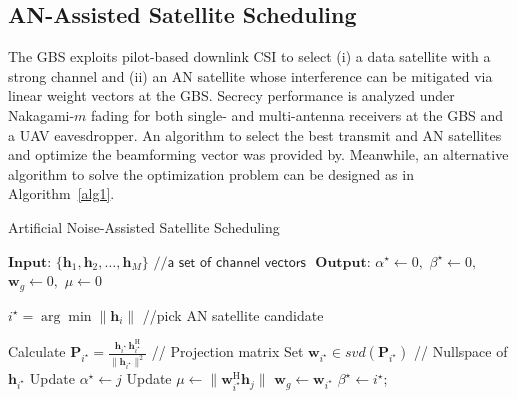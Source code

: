 \documentclass[conference]{IEEEtran}
\begin{document}
\subsection{AN-Assisted Satellite Scheduling} \label{sec3.2}
The GBS exploits pilot-based downlink CSI to select (i) a data satellite with a strong channel and (ii) an AN satellite whose interference can be mitigated via linear weight vectors at the GBS. Secrecy performance is analyzed under Nakagami-$m$ fading for both single- and multi-antenna receivers at the GBS and a UAV eavesdropper. An algorithm to select the best transmit and AN satellites and optimize the beamforming vector was provided by\cite{YLee:25}. Meanwhile, an alternative algorithm to solve the optimization problem can be designed as in Algorithm~\ref{alg1}.

\begin{algorithm}
  \caption{Artificial Noise-Assisted Satellite Scheduling}
  \begin{algorithmic}[1]
    \STATE $\textbf{Input:}$ $\{\mathbf{h}_1, \mathbf{h}_2, \ldots, \mathbf{h}_M\}$ $\textsf{//a set of channel vectors }$
    \STATE $\textbf{Output:}$ $\alpha^\star\leftarrow 0,$  $\beta^\star\leftarrow 0, $ $\mathbf{w}_g\leftarrow 0, $ $\mu\leftarrow 0$
    
      \STATE $i^\star = \arg\min \|\mathbf{h}_i\|$ \textsf{//pick AN satellite candidate}
      
      \STATE Calculate $\mathbf{P}_{i^\star}= \frac{\mathbf{h}_ {i^\star}\,\mathbf{h}_{i^\star}^{\mathrm H}}{\lVert \mathbf{h}_{i^\star} \rVert^{2}}$ \textsf{// Projection matrix }
      \STATE Set $\mathbf{w}_{i^\star}\in svd(\mathbf{P}_{i^\star})$ \textsf{// Nullspace of $\mathbf{h}_{i^\star}$}
            \STATE Update $\alpha^\star \leftarrow j$
            \STATE Update $\mu \leftarrow \big\lVert \mathbf{w}_{i^\star}^{\mathrm H}\mathbf{h}_j \big\rVert$
            \STATE $\mathbf{w}_g \leftarrow \mathbf{w}_{i^\star}$
            \STATE $\beta^\star \leftarrow i^\star$;
          \ENDIF
      \ENDFOR
    \ENDFOR
  \end{algorithmic}
  \label{alg1}
\end{algorithm}
\end{document}
